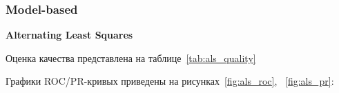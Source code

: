 \pagebreak

\subsubsection{Model-based}
\vspace{1em}
\textbf{Alternating Least Squares}

Оценка качества представлена на таблице~\ref{tab:als_quality}

\begin{table}[h]
    \caption{Значения метрик для ALS}
    \label{tab:als_quality}
\end{table}

Графики ROC/PR-кривых приведены на рисунках~\ref{fig:als_roc}, ~\ref{fig:als_pr}:

